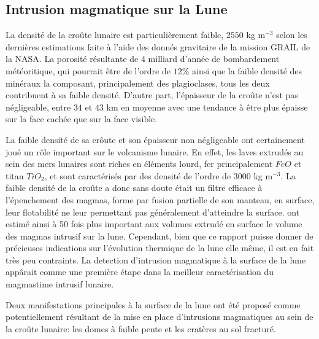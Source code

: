 \subsection{Intrusion magmatique sur la Lune}
\label{sec:moon}

La densité de la croûte lunaire est particulièrement faible, $2550$ kg
m$^{-3}$ selon  les dernières  estimations faite  à l'aide  des donnés
gravitaire de  la mission  GRAIL de  la NASA\citep{Wieczorek:2013ipa}.
La  porosité   résultante  de  4  milliard   d'année  de  bombardement
météoritique,  qui pourrait  être de  l'ordre de  $12\%$ ainsi  que la
faible  densité   des  minéraux   la  composant,   principalement  des
plagioclases, tous les  deux contribuent à sa  faible densité. D'autre
part, l'épaisseur  de la croûte  n'est pas négligeable, entre  $34$ et
$43$ km en moyenne  avec une tendance à être plus  épaisse sur la face
cachée que sur la face visible.

La faible  densité de sa crôute  et son épaisseur non  négligeable ont
certainement joué  un rôle  important sur  le volcanisme  lunaire.  En
effet, les  laves extrudés au  sein des  mers lunaires sont  riches en
éléments lourd,  fer principalement  $FeO$ et  titan $TiO_2$,  et sont
caractérisés  par des  densité de  l'ordre de  $3000$ kg  m$^{-3}$. La
faible densité de la croûte a donc sans doute était un filtre efficace
à l'épenchement des magmas, forme par fusion partielle de son manteau,
en  surface,  leur flotabilité  ne  leur  permettant pas  généralement
d'atteindre la surface. \citet{Head:1992bk} ont estimé ainsi à 50 fois
plus important  aux volumes  extrudé en surface  le volume  des magmas
intrusif sur la lune.  Cependant, bien que ce rapport puisse donner de
précieuses indications sur l'évolution thermique de la lune elle même,
il  est  en  fait  très  peu  contraints.   La  detection  d'intrusion
magmatique à la  surface de la lune appârait comme  une première étape
dans la meilleur caractérisation du magmastime intrusif lunaire.

Deux  manifestations principales  à  la  surface de  la  lune ont  été
proposé  comme   potentiellement  résultant   de  la  mise   en  place
d'intrusions magmatiques  au sein  de la croûte  lunaire: les  domes à
faible pente et les cratères au sol fracturé.

